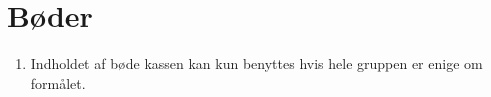 \section{Bøder}
\begin{enumerate}
\item{Indholdet af bøde kassen kan kun benyttes hvis hele gruppen er enige om formålet.}
\end{enumerate}
